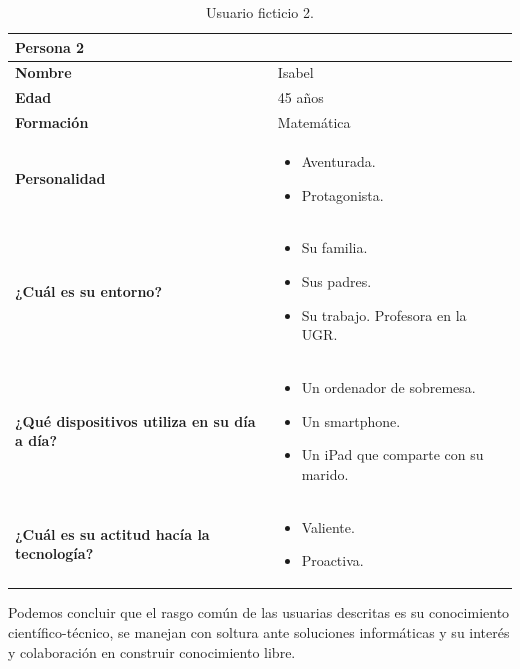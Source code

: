 \begin{table}[H]
   \begin{center}
      \begin{tabular}{| p{} | p{} |}
         \hline
         Persona 2 &  \\ \hline
         \textbf{Nombre} & Isabel \\
         \textbf{Edad} & 45 años \\
         \textbf{Formación} & Matemática \\
         \textbf{Personalidad} & \begin{itemize}
                \item Aventurada.
                \item Protagonista. \end{itemize} \\
         \textbf{¿Cuál es su entorno?} & \begin{itemize}
                \item Su familia.
                \item Sus padres.
                \item Su trabajo. Profesora en la UGR. \end{itemize} \\
         \textbf{¿Qué dispositivos utiliza en su día a día?} & \begin{itemize}
                \item Un ordenador de sobremesa.
                \item Un smartphone.
                \item Un iPad que comparte con su marido. \end{itemize} \\
            \textbf{¿Cuál es su actitud hacía la tecnología?} & \begin{itemize}
                \item Valiente.
                \item Proactiva. \end{itemize} \\
            \hline
      \end{tabular}
      \caption{Usuario ficticio 2.}
   \end{center}
\end{table}


Podemos concluir que el rasgo común de las usuarias descritas es su conocimiento
científico-técnico, se manejan con soltura ante soluciones informáticas y su interés 
y colaboración en construir conocimiento libre.